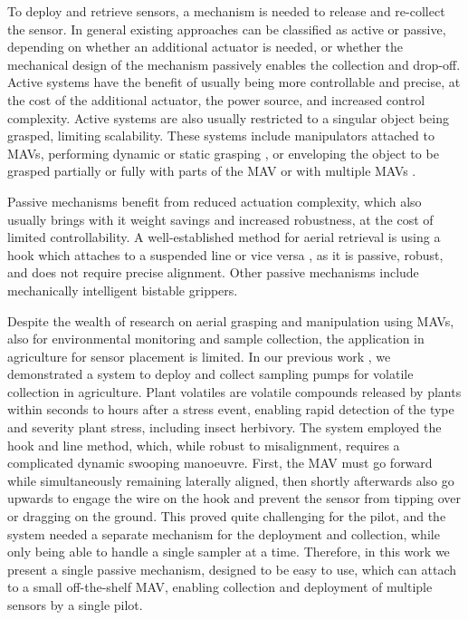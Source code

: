 To deploy and retrieve sensors, a mechanism is needed to release and re-collect the sensor. In general existing approaches can be classified as active or passive, depending on whether an additional actuator is needed, or whether the mechanical design of the mechanism passively enables the collection and drop-off. Active systems have the benefit of usually being more controllable and precise, at the cost of the additional actuator, the power source, and increased control complexity. Active systems are also usually restricted to a singular object being grasped, limiting scalability. These systems include manipulators attached to \acp{MAV}, performing dynamic or static grasping \cite{Ollero2022, Fishman2021, Kim2018c, Orsag2014, Suarez2017, Lee2021a, Roderick2021}, or enveloping the object to be grasped partially or fully with parts of the \ac{MAV} or with multiple \acp{MAV} \cite{Hingston2020, Gabrich2018, Bamert, Zhao2017}.

Passive mechanisms benefit from reduced actuation complexity, which also usually brings with it weight savings and increased robustness, at the cost of limited controllability. A well-established method for aerial retrieval is using a hook which attaches to a suspended line or vice versa \cite{Leary, Geckeler2023a, Jiang2023}, as it is passive, robust, and does not require precise alignment. Other passive mechanisms include mechanically intelligent bistable grippers\cite{Firouzeh2023, Hsiao2022, Geckeler2022a}.

Despite the wealth of research on aerial grasping and manipulation using \acp{MAV}, also for environmental monitoring and sample collection, the application in agriculture for sensor placement is limited. In our previous work \cite{Geckeler2023a}, we demonstrated a system to deploy and collect sampling pumps for volatile collection in agriculture. Plant volatiles are volatile compounds released by plants within seconds to hours after a stress event, enabling rapid detection of the type and severity plant stress, including insect herbivory. The system employed the hook and line method, which, while robust to misalignment, requires a complicated dynamic swooping manoeuvre. First, the \ac{MAV} must go forward while simultaneously remaining laterally aligned, then shortly afterwards also go upwards to engage the wire on the hook and prevent the sensor from tipping over or dragging on the ground. This proved quite challenging for the pilot, and the system needed a separate mechanism for the deployment and collection, while only being able to handle a single sampler at a time. Therefore, in this work we present a single passive mechanism, designed to be easy to use, which can attach to a small off-the-shelf \ac{MAV}, enabling collection and deployment of multiple sensors by a single pilot. 


